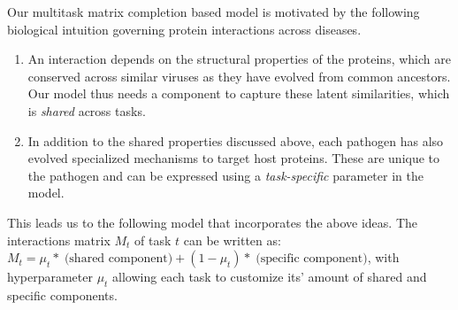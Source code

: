 \documentclass[runningheads,a4paper]{llncs}
\begin{document}
Our multitask matrix completion based model is motivated by the following biological intuition governing protein interactions across diseases.
\begin{enumerate}
\item An interaction depends on the structural properties of the proteins, which are conserved across similar viruses as they have evolved from common ancestors. Our model thus needs a component to capture these latent similarities, which is \textit{shared} across tasks.
\item In addition to the shared properties discussed above, each pathogen has also evolved specialized mechanisms to target host proteins. These are unique to the pathogen and can be expressed using a \textit{task-specific} parameter in the model.
\end{enumerate}

This leads us to the following model that incorporates the above ideas. The interactions matrix $M_t$ of task $t$ can be written as: $M_t = \mu_t *\; \textrm{(shared component)} + (1-\mu_t) *\; \textrm{(specific component)} $, with hyperparameter $\mu_t$ allowing each task to customize its' amount of shared and specific components.
\end{document}

